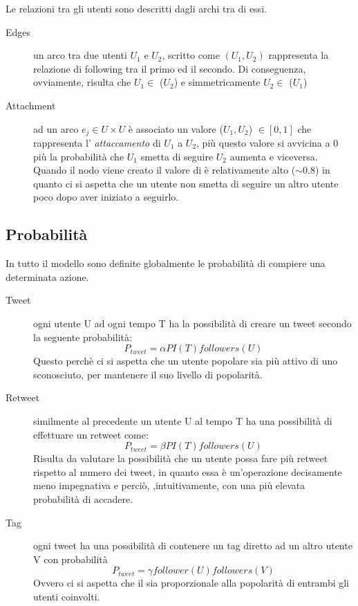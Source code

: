 Le relazioni tra gli utenti sono descritti dagli archi tra di essi.
\begin{description}
  \item[Edges] un arco tra due utenti $U_1$ e $U_2$, scritto come
  $(U_1 ,U_2)$ rappresenta la relazione di following tra il primo 
  ed il secondo. Di conseguenza, ovviamente, 
  risulta che $U_1 \in $  \followers{}($U_2$) e simmetricamente
   $U_2 \in $  \following{}($U_1$)
   \item[Attachment] ad un arco $e_j \in U\times U$ \`e associato un 
   valore \attach{}($U_1, U_2$) $ \in [0,1]$ che rappresenta l' 
   \textit{attaccamento} di $U_1$ a $U_2$, pi\`u questo valore si 
   avvicina a 0 pi\`u la probabilit\`a che $U_1$ smetta di seguire
   $U_2$ aumenta e viceversa. Quando il nodo viene creato il valore
   di \attach{} \`e relativamente alto ($\sim 0.8$) in quanto ci si 
   aspetta che un utente non smetta di seguire un altro utente
   poco dopo aver iniziato a seguirlo.
\end{description}

\subsection{Probabilit\`a}
\label{subsec:prob}

In tutto il modello sono definite globalmente le 
probabilit\`a di compiere una determinata azione.

\begin{description}
  \item[Tweet] ogni utente U ad ogni tempo T ha la possibilit\`a
  di creare un tweet secondo la seguente probabilit\`a:
  \begin{equation*}
    P_{tweet} = \alpha PI(T) followers(U)
  \end{equation*}
  Questo perch\`e ci si aspetta che un utente popolare sia pi\`u 
  attivo di uno sconosciuto, per mantenere il suo livello di 
  popolarit\`a.
  \item[Retweet] similmente al precedente un utente U al tempo T
  ha una possibilit\`a di effettuare un retweet come:
    \begin{equation*}
        P_{tweet} = \beta PI(T) followers(U)
    \end{equation*}
    Risulta da valutare la possibilit\`a che un utente possa fare 
    pi\`u  retweet rispetto al numero dei tweet, in quanto essa \`e
    un'operazione decisamente meno impegnativa e perci\`o,
    ,intuitivamente,
    con una pi\`u elevata probabilit\`a di accadere.
  \item[Tag] ogni tweet ha una possibilit\`a di contenere un tag 
  diretto ad un altro utente V con probabilit\`a
  \begin{equation*}
    P_{tweet} = \gamma follower(U) followers(V)
  \end{equation*} 
  Ovvero ci si aspetta che il \dtag{} sia proporzionale alla 
  popolarit\`a di entrambi gli utenti coinvolti.
\end{description}

